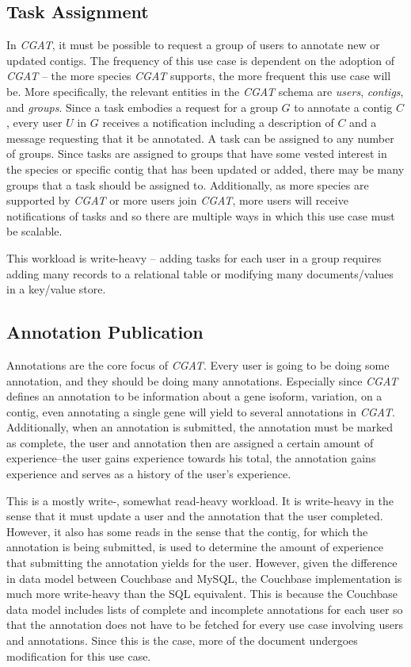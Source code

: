 \documentclass[10pt, conference, compsocconf]{IEEEtran}
\begin{document}
\subsection{Task Assignment}
In \textit{CGAT}, it must be possible to request a group of users to annotate
new or updated contigs. The frequency of this use case is dependent on the
adoption of \textit{CGAT} -- the more species \textit{CGAT} supports, the more
frequent this use case will be. More specifically, the relevant entities in the
\textit{CGAT} schema are \textit{users}, \textit{contigs}, and \textit{groups}.
Since a task embodies a request for a group $G$ to annotate a contig $C$, every
user $U$ in $G$ receives a notification including a description of $C$ and a
message requesting that it be annotated. A task can be assigned to any number
of groups. Since tasks are assigned to groups that have some vested interest in
the species or specific contig that has been updated or added, there may be
many groups that a task should be assigned to. Additionally, as more species
are supported by \textit{CGAT} or more users join \textit{CGAT}, more users
will receive notifications of tasks and so there are multiple ways in which
this use case must be scalable.

This workload is write-heavy -- adding tasks for each user in a group requires
adding many records to a relational table or modifying many documents/values
in a key/value store.

\subsection{Annotation Publication}
Annotations are the core focus of \textit{CGAT}. Every user is going to be
doing some annotation, and they should be doing many annotations. Especially
since \textit{CGAT} defines an annotation to be information about a gene
isoform, variation, on a contig, even annotating a single gene will yield to several
annotations in \textit{CGAT}. Additionally, when an annotation is submitted,
the annotation must be marked as complete, the user and annotation then are
assigned a certain amount of experience--the user gains experience towards
his total, the annotation gains experience and serves as a history of the
user's experience.

This is a mostly write-, somewhat read-heavy workload. It is write-heavy in the
sense that it must update a user and the annotation that the user completed.
However, it also has some reads in the sense that the contig, for which the
annotation is being submitted, is used to determine the amount of experience
that submitting the annotation yields for the user. However, given the
difference in data model between Couchbase and MySQL, the Couchbase
implementation is much more write-heavy than the SQL equivalent. This is
because the Couchbase data model includes lists of complete and incomplete
annotations for each user so that the annotation does not have to be fetched
for every use case involving users and annotations. Since this is the case,
more of the document undergoes modification for this use case.
\end{document}
